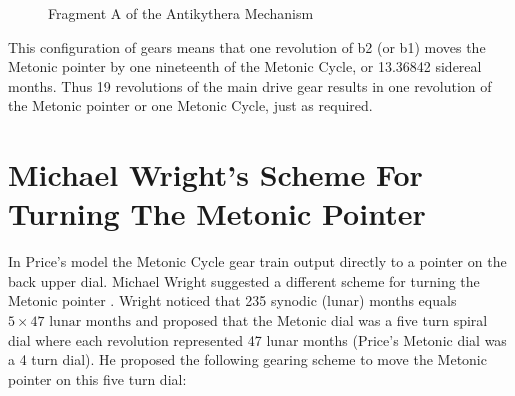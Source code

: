 \documentclass[11pt, oneside]{article}   	%
\theoremstyle{definition}
\begin{document}
\bigskip
\begin{figure}[H]
\caption{Fragment A of the Antikythera Mechanism \cite{wiki:fragmentA}}
\label{fig:fragmentA}
\end{figure}

\bigskip
\noindent
This configuration of gears means that one revolution of b2 (or b1) moves the Metonic pointer by one nineteenth of the Metonic Cycle, 
or 13.36842 sidereal months. Thus 19 revolutions of the main drive gear results in one revolution of the Metonic pointer or one Metonic Cycle, 
just as required.

\section{Michael Wright's Scheme For Turning The Metonic Pointer}
In Price's model the Metonic Cycle gear train output directly to a pointer on the back upper dial. Michael Wright suggested a different scheme for turning 
the Metonic pointer \cite{Wright2005a}. Wright noticed that 235 synodic (lunar) months equals $5 \times 47 \text{ lunar months}$ and proposed that the 
Metonic dial was a five turn spiral dial where each revolution represented 47 lunar months (Price's Metonic dial was a 4 turn dial). He proposed the following 
gearing scheme to move the Metonic pointer on this five turn dial:
\end{document}

